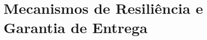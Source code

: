\chapter{Mecanismos de Resiliência e Garantia de Entrega}
\label{chap:appendix-fault-tolerance}

\section{}
